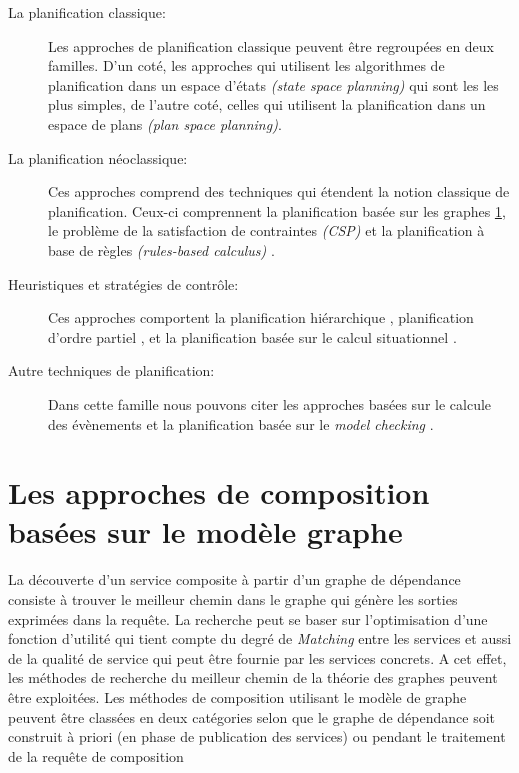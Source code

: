   \renewcommand{\descriptionlabel}[1]{\hspace{0.5cm}\textbullet~\textsf{#1}}
  \begin{description}
  \item [La planification classique: ] Les approches de planification
    classique \cite{akkiraju2004executing, zeng2008dynamic} peuvent
    être regroupées en deux familles. D'un coté, les approches qui
    utilisent les algorithmes de planification dans un espace d'états
    \textit{(state space planning)} qui sont les les plus simples, de
    l'autre coté, celles qui utilisent la planification dans un espace
    de plans \textit{(plan space planning)}.

  \item [La planification néoclassique:] Ces approches comprend des
    techniques qui étendent la notion classique de
    planification. Ceux-ci comprennent la planification basée sur les
    graphes \ref{sec:graph-base-composition}, le problème de la
    satisfaction de contraintes \textit{(CSP)}
    \cite{paik2007automatic} et la planification à base de règles
    \textit{(rules-based calculus)} \cite{medjahed2004semantic,
      rao2006mixed}.

  \item [Heuristiques et stratégies de contrôle:] Ces approches
    comportent la planification hiérarchique \cite{wu2003automating,
      sirin2004htn}, planification d'ordre partiel \cite{peer2005pop,
      klusch2005semantic}, et la planification basée sur le calcul
    situationnel \cite{mcilraith2002adapting, sohrabi2009web}.

  \item [Autre techniques de planification:] Dans cette famille nous
    pouvons citer les approches basées sur le calcule des évènements
    \cite{aydin2008automated} et la planification basée sur le
    \textit{model checking}
    \cite{pistore2004planning,pistore2005automated}.
  \end{description}
  \enddescription

  \section{Les approches de composition basées sur le modèle graphe}
  \label{sec:graph-base-composition}

  La découverte d'un service composite à partir d'un graphe de
  dépendance consiste à trouver le meilleur chemin dans le graphe qui
  génère les sorties exprimées dans la requête. La recherche peut se
  baser sur l'optimisation d'une fonction d'utilité qui tient compte
  du degré de \textit{Matching} entre les services et aussi de la qualité de
  service qui peut être fournie par les services concrets. A cet
  effet, les méthodes de recherche du meilleur chemin de la théorie
  des graphes peuvent être exploitées.  Les méthodes de composition
  utilisant le modèle de graphe peuvent être classées en deux
  catégories selon que le graphe de dépendance soit construit à priori
  (en phase de publication des services) ou pendant le traitement de
  la requête de composition

